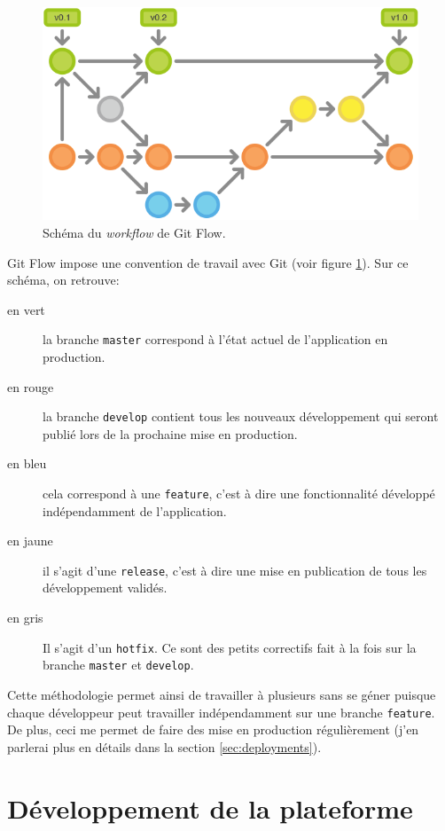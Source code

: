 \documentclass[]{report}
\begin{document}
    \begin{figure}
      \includegraphics[width=\linewidth]{img/git-flow.png}
      \caption{Schéma du \textit{workflow} de Git Flow.}
      \label{fig:git-flow}
    \end{figure}

    Git Flow impose une convention de travail avec Git (voir figure \ref{fig:git-flow}). Sur ce schéma, on retrouve:

    \begin{description}
      \item[en vert] la branche \verb|master| correspond à l'état actuel de l'application en production.
      \item[en rouge] la branche \verb|develop| contient tous les nouveaux développement qui seront publié lors de la prochaine mise en production.
      \item[en bleu] cela correspond à une \verb|feature|, c'est à dire une fonctionnalité développé indépendamment de l'application.
      \item[en jaune] il s'agit d'une \verb|release|, c'est à dire une mise en publication de tous les développement validés.
      \item[en gris] Il s'agit d'un \verb|hotfix|. Ce sont des petits correctifs fait à la fois sur la branche \verb|master| et \verb|develop|.
    \end{description}

    Cette méthodologie permet ainsi de travailler à plusieurs sans se géner puisque chaque développeur peut travailler indépendamment sur une branche \verb|feature|. De plus, ceci me permet de faire des mise en production régulièrement (j'en parlerai plus en détails dans la section \ref{sec:deployments}).

\chapter{Développement de la plateforme}
\end{document}
